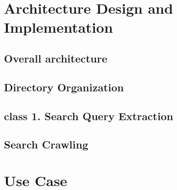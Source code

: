 \documentclass[conference]{IEEEtran}
\begin{document}
\section{Architecture Design and Implementation} %
\label{sec:architecture_design_and_implementation}

\subsection{Overall architecture} %
\label{sub:overall_architecture}

\subsection{Directory Organization} %
\label{sub:directory_organization}

\subsection{class 1. Search Query Extraction} %
\label{sub:search_query_extraction}

\subsection{Search Crawling} %
\label{sub:search_crawling}




\section{Use Case} %
\label{sec:use_case}











\end{document}
